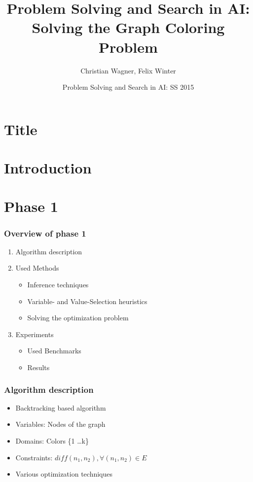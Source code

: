 \documentclass{beamer}
\title[Solving the Graph Coloring Problem] %
{Problem Solving and Search in AI: Solving the Graph Coloring
Problem}
\author{Christian Wagner, Felix Winter}
\institute
{
  TU Wien  
}
\date[SS 2015] %
{Problem Solving and Search in AI: SS 2015}
\begin{document}
\section{Title}
  \frame{\titlepage}


\section{Introduction}




\section{Phase 1}
  \begin{frame}
    \frametitle{Overview of phase 1}

    \begin{enumerate}
      \item Algorithm description
      \item Used Methods
        \begin{itemize}
        \item{Inference techniques}
        \item{Variable- and Value-Selection heuristics}
        \item{Solving the optimization problem}
        \end{itemize}
        
      \item{Experiments}
        \begin{itemize}
        \item{Used Benchmarks}
        \item{Results}
        \end{itemize}

    \end{enumerate}
  \end{frame}


  \begin{frame}
    \frametitle{Algorithm description}
    \begin{itemize}
    \item{Backtracking based algorithm}
    \item{Variables: Nodes of the graph}
    \item{Domains: Colors \{1 \dots k\}}
    \item{Constraints: $diff(n_1, n_2),  \forall (n_1, n_2) \in E$}
    \item{Various optimization techniques}
    \end{itemize}


  \end{frame}
\end{document}
